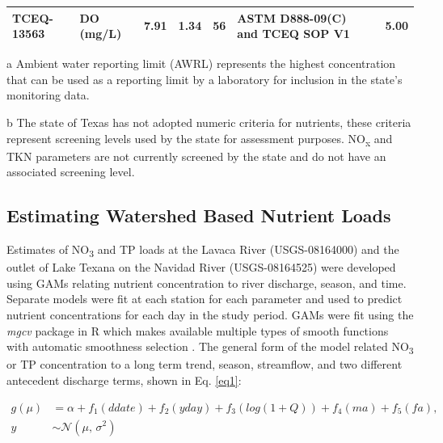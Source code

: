\documentclass[fleqn,10pt,lineno]{wlpeerj} %
\begin{document}
\begin{table}
\begin{threeparttable}
\begin{tabular}[t]{lllll>{\raggedright\arraybackslash}p{3cm}rr}
\multirow{-5}{*}{\raggedright\arraybackslash TCEQ-13563} & DO (mg/L) & 7.91 & 1.34 & 56 & ASTM D888-09(C) and TCEQ SOP V1 &  & 5.00\\
\bottomrule
\end{tabular}
\begin{tablenotes}
\item[a] Ambient water reporting limit (AWRL) represents the highest concentration that can be used as a reporting limit by a laboratory for inclusion in the state's monitoring data.
\item[b] The state of Texas has not adopted numeric criteria for nutrients, these criteria represent screening levels used by the state for assessment purposes. NO\textsubscript{x} and TKN parameters are not currently screened by the state and do not have an associated screening level.
\end{tablenotes}
\end{threeparttable}
\end{table}

\hypertarget{estimating-watershed-based-nutrient-loads}{%
\subsection*{Estimating Watershed Based Nutrient
Loads}\label{estimating-watershed-based-nutrient-loads}}

Estimates of NO\textsubscript{3} and TP loads at the Lavaca River
(USGS-08164000) and the outlet of Lake Texana on the Navidad River
(USGS-08164525) were developed using GAMs relating nutrient
concentration to river discharge, season, and time. Separate models were
fit at each station for each parameter and used to predict nutrient
concentrations for each day in the study period. GAMs were fit using the
\emph{mgcv} package in R which makes available multiple types of smooth
functions with automatic smoothness selection
\autocite{woodFastStableRestricted2011}. The general form of the model
related NO\textsubscript{3} or TP concentration to a long term trend,
season, streamflow, and two different antecedent discharge terms, shown
in Eq. \ref{eq1}:

\begin{align}
g(\mu) &= \alpha + f_1(ddate) + f_2(yday) + f_3(log(1+Q)) + f_4(ma) + f_5(fa), \nonumber \\
y &\sim \mathcal{N}(\mu,\,\sigma^{2})
\label{eq1}
\end{align}
\end{document}
